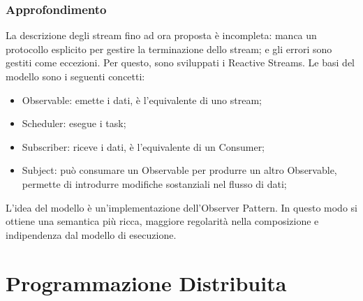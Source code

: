 \documentclass{article}
\begin{document}
\subsubsection{Approfondimento}
La descrizione degli stream fino ad ora proposta è incompleta: manca un
protocollo esplicito per gestire la terminazione dello stream; e gli errori sono
gestiti come eccezioni. Per questo, sono sviluppati i Reactive Streams. Le basi
del modello sono i seguenti concetti:
\begin{itemize}
	\item Observable: emette i dati, è l'equivalente di uno stream;

	\item Scheduler: esegue i task;

	\item Subscriber: riceve i dati, è l'equivalente di un Consumer;

	\item Subject: può consumare un Observable per produrre un altro Observable,
		permette di introdurre modifiche sostanziali nel flusso di dati;
\end{itemize}

L'idea del modello è un'implementazione dell'Observer Pattern.
In questo modo si ottiene una semantica più ricca, maggiore regolarità nella
composizione e indipendenza dal modello di esecuzione.

\section{Programmazione Distribuita}
\end{document}
